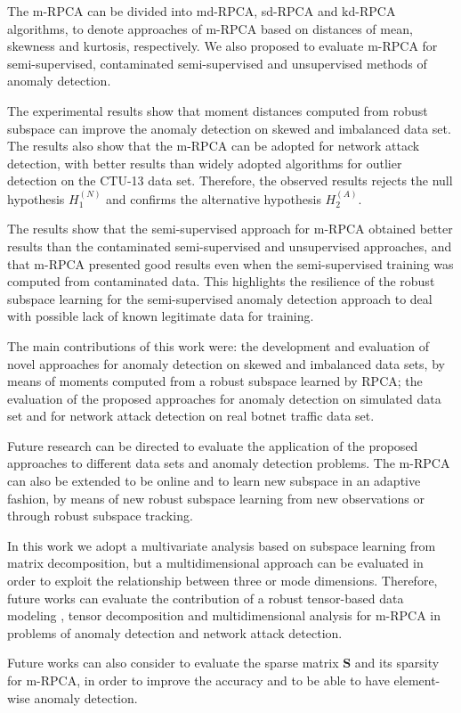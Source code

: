 The m-RPCA can be divided into md-RPCA, sd-RPCA and kd-RPCA algorithms, to denote approaches of m-RPCA based on distances of mean, skewness and kurtosis, respectively. We also proposed to evaluate m-RPCA for semi-supervised, contaminated semi-supervised and unsupervised methods of anomaly detection.

The experimental results show that moment distances computed from robust subspace can improve the anomaly detection on skewed and imbalanced data set. The results also show that the m-RPCA can be adopted for network attack detection, with better results than widely adopted algorithms for outlier detection on the CTU-13 data set. Therefore, the observed results rejects the null hypothesis $H_1^{(N)}$ and confirms the alternative
hypothesis $H_2^{(A)}$.

The results show that the semi-supervised approach for m-RPCA obtained better results than the contaminated semi-supervised and unsupervised approaches, and that m-RPCA presented good results even when the semi-supervised training was computed from contaminated data. This highlights the resilience of the robust subspace learning for the semi-supervised anomaly detection approach to deal with possible lack of known legitimate data for training. 

The main contributions of this work were: the development and evaluation of novel approaches for anomaly detection on skewed and imbalanced data sets, by means of moments computed from a robust subspace learned by RPCA; the evaluation of the proposed approaches for anomaly detection on simulated data set and for network attack detection on real botnet traffic data set.

Future research can be directed to evaluate the application of the proposed approaches to different data sets and anomaly detection problems. The m-RPCA can also be extended to be online and to learn new subspace in an adaptive fashion, by means of new robust subspace learning from new observations or through robust subspace tracking.

In this work we adopt a multivariate analysis based on subspace learning from matrix decomposition, but a multidimensional approach can be evaluated in order to exploit the relationship between three or mode dimensions. Therefore, future works can evaluate the contribution of a robust tensor-based data modeling \cite{da2008robust, gomes2017tensor}, tensor decomposition \cite{gomes2019tensor} and multidimensional analysis for m-RPCA in problems of anomaly detection and network attack detection.

Future works can also consider to evaluate the sparse matrix $\pmb{S}$ and its sparsity \cite{liu2017tensor} for m-RPCA, in order to improve the accuracy and to be able to have element-wise anomaly detection.
